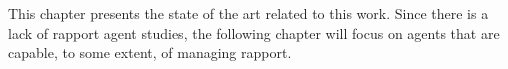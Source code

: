 \label{chap:relatedwork}

This chapter presents the state of the art related to this work. Since there is a lack of rapport agent studies, the following chapter will focus on agents that are capable, to some extent, of managing rapport.







